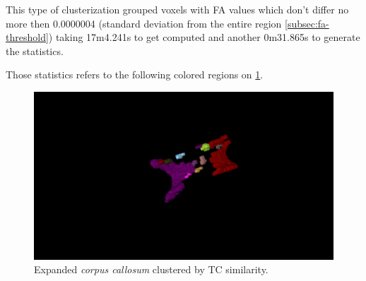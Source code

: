 \documentclass[a4paper,11pt]{report}
\begin{document}
    This type of clusterization grouped voxels with FA values which don't differ no more then 0.0000004 (standard deviation from the entire region \ref{subsec:fa-threshold}) taking 17m4.241s to get computed and another 0m31.865s to generate the statistics.

    Those statistics refers to the following colored regions on \ref{fig:tc-regions}.

    \begin{figure}[!ht]
      \includegraphics[width=1\linewidth]{img/regions/tc_regions.png}
      \caption{Expanded \textit{corpus callosum} clustered by TC similarity.}
      \label{fig:tc-regions}
    \end{figure}

    \newpage
\end{document}
